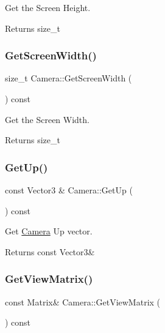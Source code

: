 Get the Screen Height. 

\begin{DoxyReturn}{Returns}
size\+\_\+t 
\end{DoxyReturn}
\mbox{\label{classCamera_aa2812325bada4a9c1955f005c125b313}} 
\subsubsection{\texorpdfstring{Get\+Screen\+Width()}{GetScreenWidth()}}
{\footnotesize\ttfamily size\+\_\+t Camera\+::\+Get\+Screen\+Width (\begin{DoxyParamCaption}{ }\end{DoxyParamCaption}) const}



Get the Screen Width. 

\begin{DoxyReturn}{Returns}
size\+\_\+t 
\end{DoxyReturn}
\mbox{\label{classCamera_a0d14fb92d976926e8fcec4409c1e2812}} 
\subsubsection{\texorpdfstring{Get\+Up()}{GetUp()}}
{\footnotesize\ttfamily const Vector3 \& Camera\+::\+Get\+Up (\begin{DoxyParamCaption}{ }\end{DoxyParamCaption}) const}



Get \hyperlink{classCamera}{Camera} Up vector. 

\begin{DoxyReturn}{Returns}
const Vector3\& 
\end{DoxyReturn}
\mbox{\label{classCamera_ae56a0f8c9aa2d4eead91fe342159b1e5}} 
\subsubsection{\texorpdfstring{Get\+View\+Matrix()}{GetViewMatrix()}}
{\footnotesize\ttfamily const Matrix\& Camera\+::\+Get\+View\+Matrix (\begin{DoxyParamCaption}{ }\end{DoxyParamCaption}) const\hspace{0.3cm}{\ttfamily [inline]}}



